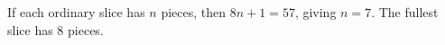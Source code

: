 If each ordinary slice has $n$ pieces, then $8n+1=57$, giving $n=7$. The fullest slice has $\boxed8$ pieces.
